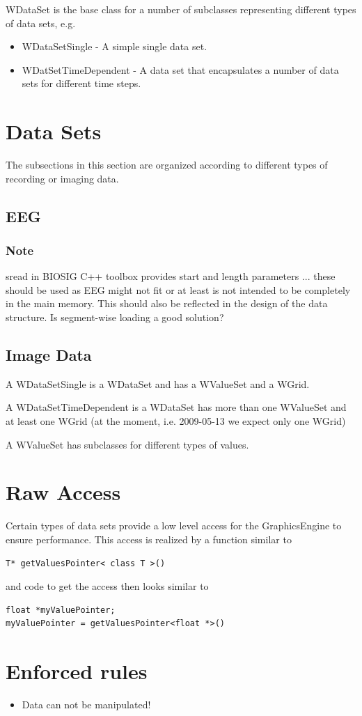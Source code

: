 \documentclass[a4paper,12pt]{scrbook}
\begin{document}
WDataSet is the base class for a number of subclasses representing different types of data sets, e.g.
\begin{itemize}
\item WDataSetSingle - A simple single data set.
\item WDatSetTimeDependent - A data set that encapsulates a number of data sets for different time steps.
\end{itemize}

\section{Data Sets}
The subsections in this section are organized according to different types of recording or imaging data.
\subsection{EEG}
\subsubsection{Note}
sread in BIOSIG C++ toolbox provides start and length parameters ... these should be used as EEG might not fit or at least is not
intended to be completely in the main memory. This should also be reflected in the design of the data structure.  Is segment-wise
loading a good solution?

\subsection{Image Data}

A WDataSetSingle is a WDataSet and has a WValueSet and a WGrid.

A WDataSetTimeDependent is a WDataSet has more than one WValueSet and at least one WGrid (at the moment, i.e. 2009-05-13 we expect
only one WGrid)

A WValueSet has subclasses for different types of values.

\section{Raw Access}
Certain types of data sets provide a low level access for the GraphicsEngine to ensure performance. This access is realized by a
function similar to
\begin{verbatim}
T* getValuesPointer< class T >()
\end{verbatim}
and code to get the access then looks similar to
\begin{verbatim}
float *myValuePointer;
myValuePointer = getValuesPointer<float *>()
\end{verbatim}

\section{Enforced rules}
\begin{itemize}
\item Data can not be manipulated!
\end{itemize}


\end{document}
